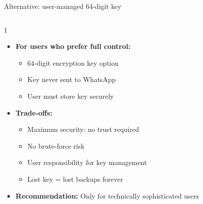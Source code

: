 \ifdefined\PRESENTATION\else\PassOptionsToClass{handout}{beamer}\fi\documentclass[aspectratio=169, lualatex]{beamer}
\begin{document}
\begin{frame}{Alternative: user-managed 64-digit key}
	\begin{columns}[c]
		\begin{column}{1\textwidth}
			\begin{itemize}
				\item \textbf{For users who prefer full control:}
				      \begin{itemize}
					      \item 64-digit encryption key option
					      \item Key never sent to WhatsApp
					      \item User must store key securely
				      \end{itemize}
				\item \textbf{Trade-offs:}
				      \begin{itemize}
					      \item[\textcolor{green}{\mycheckmark}] Maximum security: no trust required
					      \item[\textcolor{green}{\mycheckmark}] No brute-force risk
					      \item[\textcolor{red}{$\times$}] User responsibility for key management
					      \item[\textcolor{red}{$\times$}] Lost key = lost backups forever
				      \end{itemize}
				\item \textbf{Recommendation:} Only for technically sophisticated users
			\end{itemize}
		\end{column}
	\end{columns}
\end{frame}
\end{document}

